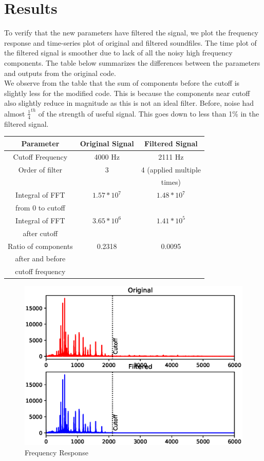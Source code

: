 \documentclass[journal,12pt,twocolumn]{IEEEtran}
\begin{document}
\section{\textbf{Results}}
To verify that the new parameters have filtered the signal, we plot the frequency response and time-series plot of original and filtered soundfiles. The time plot of the filtered signal is smoother due to lack of all the noisy high frequency components. The table below summarizes the differences between the parameters  and outputs from the original code. \\ We observe from the table that the sum of components before the cutoff is slightly less for the modified code. This is because the components near cutoff also slightly reduce in magnitude as this is not an ideal filter. Before, noise had almost $\frac{1}{4}^{th}$ of the strength of useful signal. This goes down to less than 1\% in the filtered signal. 

\begin{center}
\begin{tabular}{ |c|c|c| } 

 \hline
 Parameter & Original Signal & Filtered Signal \\
 \hline
 Cutoff Frequency & 4000 Hz & 2111 Hz \\ 
 \hline
 Order of filter & 3 & 4 (applied multiple\\
  &   &   times) \\ 
 \hline
 Integral of FFT & $1.57*10^7$ & $1.48*10^7$\\
 from 0 to cutoff &  & \\
 \hline
 Integral of FFT & $3.65*10^6$ & $1.41*10^5$\\
 after cutoff &  & \\
 \hline
 Ratio of components & 0.2318 & 0.0095\\
 after and before &  & \\
 cutoff frequency &  & \\
 \hline
\end{tabular}
\end{center}

\begin{figure}[!h]
\centering
\includegraphics[width=1.2\columnwidth]{./figs/ee18btech11051_freq_result.eps}
\caption{Frequency Response}
\label{fig:Figure1}
\end{figure}
\end{document}
